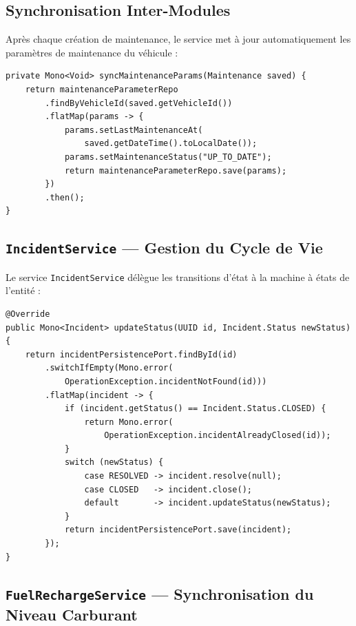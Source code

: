 \documentclass[12pt,a4paper]{report}
\begin{document}
\subsection{Synchronisation Inter-Modules}

Après chaque création de maintenance, le service met à jour automatiquement les paramètres de maintenance du véhicule :

\begin{lstlisting}[style=javaStyle, caption={Synchronisation des paramètres de maintenance}]
private Mono<Void> syncMaintenanceParams(Maintenance saved) {
    return maintenanceParameterRepo
        .findByVehicleId(saved.getVehicleId())
        .flatMap(params -> {
            params.setLastMaintenanceAt(
                saved.getDateTime().toLocalDate());
            params.setMaintenanceStatus("UP_TO_DATE");
            return maintenanceParameterRepo.save(params);
        })
        .then();
}
\end{lstlisting}

\subsection{\texttt{IncidentService} — Gestion du Cycle de Vie}

Le service \texttt{IncidentService} délègue les transitions d'état à la machine à états de l'entité :

\begin{lstlisting}[style=javaStyle, caption={Délégation à la machine à états}]
@Override
public Mono<Incident> updateStatus(UUID id, Incident.Status newStatus) {
    return incidentPersistencePort.findById(id)
        .switchIfEmpty(Mono.error(
            OperationException.incidentNotFound(id)))
        .flatMap(incident -> {
            if (incident.getStatus() == Incident.Status.CLOSED) {
                return Mono.error(
                    OperationException.incidentAlreadyClosed(id));
            }
            switch (newStatus) {
                case RESOLVED -> incident.resolve(null);
                case CLOSED   -> incident.close();
                default       -> incident.updateStatus(newStatus);
            }
            return incidentPersistencePort.save(incident);
        });
}
\end{lstlisting}

\subsection{\texttt{FuelRechargeService} — Synchronisation du Niveau Carburant}
\end{document}
